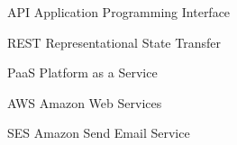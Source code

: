 \begin{siglas}
  \item[API] Application Programming Interface
  \item[REST] Representational State Transfer
  \item[PaaS] Platform as a Service
  \item[AWS] Amazon Web Services
  \item[SES] Amazon Send Email Service
\end{siglas}